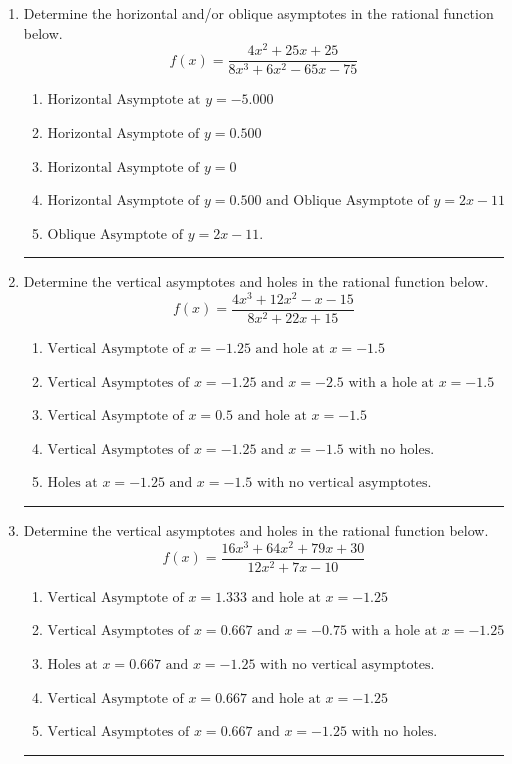 \documentclass[14pt]{extbook}
\newcommand{\litem}[1]{\item#1\hspace*{-1cm}\rule{\textwidth}{0.4pt}}
\begin{document}
\begin{enumerate}
\litem{
Determine the horizontal and/or oblique asymptotes in the rational function below.\[ f(x) = \frac{4x^{2} +25 x + 25}{8x^{3} +6 x^{2} -65 x -75} \]\begin{enumerate}[label=\Alph*.]
\item \( \text{Horizontal Asymptote at } y = -5.000 \)
\item \( \text{Horizontal Asymptote of } y = 0.500  \)
\item \( \text{Horizontal Asymptote of } y = 0 \)
\item \( \text{Horizontal Asymptote of } y = 0.500 \text{ and Oblique Asymptote of } y = 2x -11 \)
\item \( \text{Oblique Asymptote of } y = 2x -11. \)

\end{enumerate} }
\litem{
Determine the vertical asymptotes and holes in the rational function below.\[ f(x) = \frac{4x^{3} +12 x^{2} -x -15}{8x^{2} +22 x + 15} \]\begin{enumerate}[label=\Alph*.]
\item \( \text{Vertical Asymptote of } x = -1.25 \text{ and hole at } x = -1.5 \)
\item \( \text{Vertical Asymptotes of } x = -1.25 \text{ and } x = -2.5 \text{ with a hole at } x = -1.5 \)
\item \( \text{Vertical Asymptote of } x = 0.5 \text{ and hole at } x = -1.5 \)
\item \( \text{Vertical Asymptotes of } x = -1.25 \text{ and } x = -1.5 \text{ with no holes.} \)
\item \( \text{Holes at } x = -1.25 \text{ and } x = -1.5 \text{ with no vertical asymptotes.} \)

\end{enumerate} }
\litem{
Determine the vertical asymptotes and holes in the rational function below.\[ f(x) = \frac{16x^{3} +64 x^{2} +79 x + 30}{12x^{2} +7 x -10} \]\begin{enumerate}[label=\Alph*.]
\item \( \text{Vertical Asymptote of } x = 1.333 \text{ and hole at } x = -1.25 \)
\item \( \text{Vertical Asymptotes of } x = 0.667 \text{ and } x = -0.75 \text{ with a hole at } x = -1.25 \)
\item \( \text{Holes at } x = 0.667 \text{ and } x = -1.25 \text{ with no vertical asymptotes.} \)
\item \( \text{Vertical Asymptote of } x = 0.667 \text{ and hole at } x = -1.25 \)
\item \( \text{Vertical Asymptotes of } x = 0.667 \text{ and } x = -1.25 \text{ with no holes.} \)


\end{enumerate}}
\end{enumerate}
\end{document}
